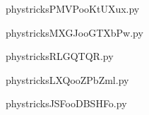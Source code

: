    

    \clearpage
    


    \newcommand{\CaptionFigPMVPooKtUXux}{<+Type your caption here+>}
    \begin{center}
        
    \end{center}
    phystricksPMVPooKtUXux.py

    

    \clearpage
    


    \newcommand{\CaptionFigMXGJooGTXbPw}{<+Type your caption here+>}
    \begin{center}
        
    \end{center}
    phystricksMXGJooGTXbPw.py

    

    \clearpage
    


    \newcommand{\CaptionFigRLGQTQR}{<+Type your caption here+>}
    \begin{center}
        
    \end{center}
    phystricksRLGQTQR.py

    

    \clearpage
    


    \newcommand{\CaptionFigLXQooZPbZml}{<+Type your caption here+>}
    \begin{center}
        
    \end{center}
    phystricksLXQooZPbZml.py

    

    \clearpage
    


    \newcommand{\CaptionFigJSFooDBSHFo}{<+Type your caption here+>}
    \begin{center}
        
    \end{center}
    phystricksJSFooDBSHFo.py

    

    \clearpage
    


